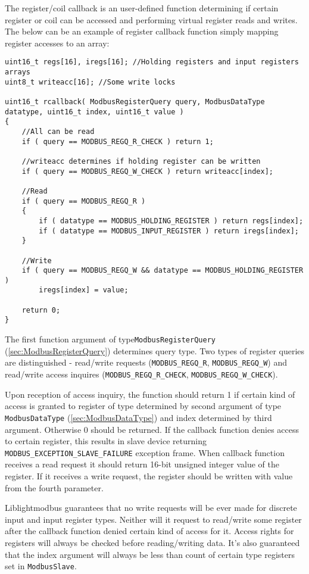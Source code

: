 \documentclass[11pt,a4paper]{article}
\newcommand{\coderef}[1]{\texttt{{#1}} (\ref{sec:#1})}
\begin{document}
The register/coil callback is an user-defined function determining if certain register or coil can be accessed and performing virtual register reads and writes. The below can be an example of register callback function simply mapping register accesses to an array:
\begin{lstlisting}[style=cstyle]
uint16_t regs[16], iregs[16]; //Holding registers and input registers arrays
uint8_t writeacc[16]; //Some write locks

uint16_t rcallback( ModbusRegisterQuery query, ModbusDataType datatype, uint16_t index, uint16_t value )
{
	//All can be read
	if ( query == MODBUS_REGQ_R_CHECK ) return 1;
	
	//writeacc determines if holding register can be written
	if ( query == MODBUS_REGQ_W_CHECK ) return writeacc[index];

	//Read
	if ( query == MODBUS_REGQ_R )
	{
		if ( datatype == MODBUS_HOLDING_REGISTER ) return regs[index];
		if ( datatype == MODBUS_INPUT_REGISTER ) return iregs[index];
	}

	//Write
	if ( query == MODBUS_REGQ_W && datatype == MODBUS_HOLDING_REGISTER )
		iregs[index] = value;

	return 0;
}
\end{lstlisting}

The first function argument of type\coderef{ModbusRegisterQuery}  determines query type. Two types of register queries are distinguished - read/write requests (\texttt{MODBUS\_REGQ\_R}, \texttt{MODBUS\_REGQ\_W}) and read/write access inquires (\texttt{MODBUS\_REGQ\_R\_CHECK}, \texttt{MODBUS\_REGQ\_W\_CHECK}).\newline

Upon reception of access inquiry, the function should return 1 if certain kind of access is granted to register of type determined by second argument of type \coderef{ModbusDataType} and index determined by third argument. Otherwise 0 should be returned. If the callback function denies access to certain register, this results in slave device returning \texttt{MODBUS\_EXCEPTION\_SLAVE\_FAILURE} exception frame. When callback function receives a read request it should return 16-bit unsigned integer value of the register. If it receives a write request, the register should be written with value from the fourth parameter.\newline

Liblightmodbus guarantees that no write requests will be ever made for discrete input and input register types. Neither will it request to read/write some register after the callback function denied certain kind of access for it. Access rights for registers will always be checked before reading/writing data. It's also guaranteed that the index argument will always be less than count of certain type registers set in \texttt{ModbusSlave}.
\end{document}
